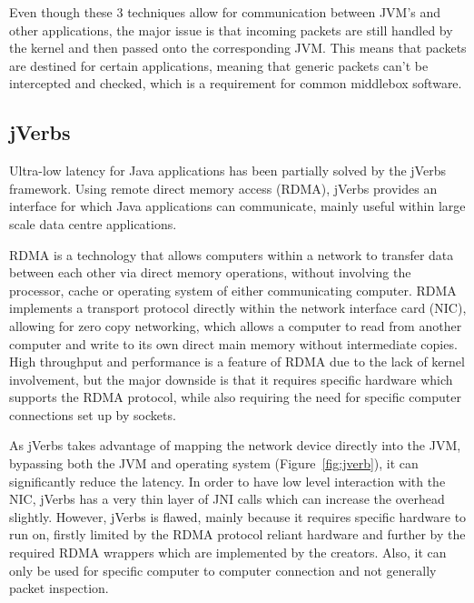 \documentclass[final_report.tex]{subfiles}
\begin{document}
Even though these 3 techniques allow for communication between JVM's and other applications, the major issue is that incoming packets are still handled by the kernel and then passed onto the corresponding JVM. This means that packets are destined for certain applications, meaning that generic packets can't be intercepted and checked, which is a requirement for common middlebox software.

\subsection{jVerbs}
Ultra-low latency for Java applications has been partially solved by the jVerbs \cite{jverbs} framework. Using remote direct memory access (RDMA), jVerbs provides an interface for which Java applications can communicate, mainly useful within large scale data centre applications.

RDMA is a technology that allows computers within a network to transfer data between each other via direct memory operations, without involving the processor, cache or operating system of either communicating computer. RDMA implements a transport protocol directly within the network interface card (NIC), allowing for zero copy networking, which allows a computer to read from another computer and write to its own direct main memory without intermediate copies. High throughput and performance is a feature of RDMA due to the lack of kernel involvement, but the major downside is that it requires specific hardware which supports the RDMA protocol, while also requiring the need for specific computer connections set up by sockets.

As jVerbs takes advantage of mapping the network device directly into the JVM, bypassing both the JVM and operating system (Figure~\ref{fig:jverb}), it can significantly reduce the latency. In order to have low level interaction with the NIC, jVerbs has a very thin layer of JNI calls which can increase the overhead slightly. However, jVerbs is flawed, mainly because it requires specific hardware to run on, firstly limited by the RDMA protocol reliant hardware and further by the required RDMA wrappers which are implemented by the creators. Also, it can only be used for specific computer to computer connection and not generally packet inspection. 
\end{document}
